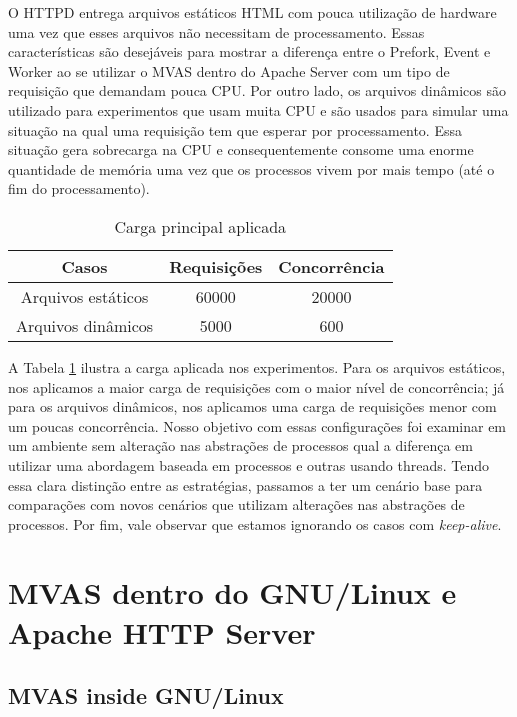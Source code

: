 O HTTPD entrega arquivos estáticos HTML com pouca utilização de hardware uma
vez que esses arquivos não necessitam de processamento. Essas características
são desejáveis para mostrar a diferença entre o Prefork, Event e Worker ao se
utilizar o MVAS dentro do Apache Server com um tipo de requisição que demandam
pouca CPU. Por outro lado, os arquivos dinâmicos são utilizado para
experimentos que usam muita CPU e são usados para simular uma situação na qual
uma requisição tem que esperar por processamento. Essa situação gera sobrecarga
na CPU e consequentemente consome uma enorme quantidade de memória uma vez que
os processos vivem por mais tempo (até o fim do processamento).

\begin{table}[h!]
  \centering
  \begin{tabular}{|c|c|c|}
    \hline
    Casos & \textbf{Requisições} & \textbf{Concorrência}\\
    \hline
    Arquivos estáticos & 60000 & 20000\\
    \hline
    Arquivos dinâmicos & 5000 & 600 \\
    \hline
  \end{tabular}
  \caption{Carga principal aplicada}
  \label{tab:loads}
\end{table}

A Tabela \ref{tab:loads} ilustra a carga aplicada nos experimentos. Para os
arquivos estáticos, nos aplicamos a maior carga de requisições com o maior
nível de concorrência; já para os arquivos dinâmicos, nos aplicamos uma carga
de requisições menor com um poucas concorrência. Nosso objetivo com essas
configurações foi examinar em um ambiente sem alteração nas abstrações de
processos qual a diferença em utilizar uma abordagem baseada em processos e
outras usando threads. Tendo essa clara distinção entre as estratégias,
passamos a ter um cenário base para comparações com novos cenários que utilizam
alterações nas abstrações de processos. Por fim, vale observar que estamos
ignorando os casos com \emph{keep-alive}.

\section{MVAS dentro do GNU/Linux e Apache HTTP Server}
\label{sec:mvas_inside_httpd}

\subsection{MVAS inside GNU/Linux}

